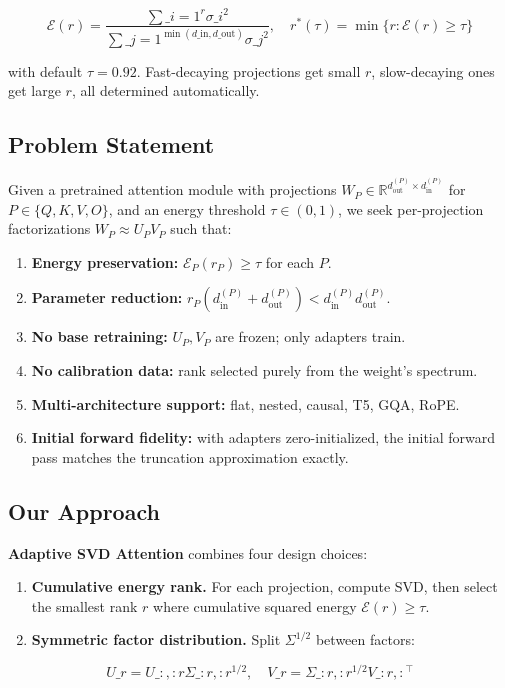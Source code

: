 \[
\mathcal{E}(r) = \frac{\sum\_{i=1}^{r} \sigma\_i^2}{\sum\_{j=1}^{\min(d\_\text{in}, d\_\text{out})} \sigma\_j^2}, \quad
r^*(\tau) = \min\{r : \mathcal{E}(r) \geq \tau\}
\tag{1.1}
\]

with default $\tau = 0.92$. Fast-decaying projections get 
small $r$, slow-decaying ones get large $r$, all determined automatically.

\subsection{Problem Statement}

Given a pretrained attention module with projections 
$W_P \in \mathbb{R}^{d_\text{out}^{(P)} \times d_\text{in}^{(P)}}$ for 
$P \in \{Q, K, V, O\}$, and an energy threshold $\tau \in (0, 1)$, we seek 
per-projection factorizations $W_P \approx U_P V_P$ such that:

\begin{enumerate}
\item \textbf{Energy preservation:} $\mathcal{E}_P(r_P) \geq \tau$ for each $P$.
\item \textbf{Parameter reduction:} $r_P (d_\text{in}^{(P)} + d_\text{out}^{(P)}) < d_\text{in}^{(P)} d_\text{out}^{(P)}$.
\item \textbf{No base retraining:} $U_P, V_P$ are frozen; only adapters train.
\item \textbf{No calibration data:} rank selected purely from the weight's spectrum.
\item \textbf{Multi-architecture support:} flat, nested, causal, T5, GQA, RoPE.
\item \textbf{Initial forward fidelity:} with adapters zero-initialized, the initial
  forward pass matches the truncation approximation exactly.

\end{enumerate}
\subsection{Our Approach}

\textbf{Adaptive SVD Attention} combines four design choices:

\begin{enumerate}
\item \textbf{Cumulative energy rank.} For each projection, compute SVD, then select
  the smallest rank $r$ where cumulative squared energy $\mathcal{E}(r) \geq \tau$.

\item \textbf{Symmetric factor distribution.} Split $\Sigma^{1/2}$ between factors:

\end{enumerate}
\[
U\_r = U\_{:, :r} \Sigma\_{:r, :r}^{1/2}, \quad
V\_r = \Sigma\_{:r, :r}^{1/2} V\_{:r, :}^\top
\tag{1.2}
\]

